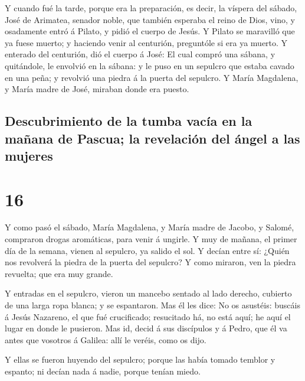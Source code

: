  Y cuando fué la tarde, porque era la preparación, es
decir, la víspera del sábado,  José de Arimatea, senador
noble, que también esperaba el reino de Dios, vino, y osadamente entró á
Pilato, y pidió el cuerpo de Jesús.  Y Pilato se
maravilló que ya fuese muerto; y haciendo venir al centurión, preguntóle
si era ya muerto.  Y enterado del centurión, dió el
cuerpo á José:  El cual compró una sábana, y quitándole,
le envolvió en la sábana: y le puso en un sepulcro que estaba cavado en
una peña; y revolvió una piedra á la puerta del sepulcro.
 Y María Magdalena, y María madre de José, miraban donde
era puesto.

\hypertarget{descubrimiento-de-la-tumba-vacuxeda-en-la-mauxf1ana-de-pascua-la-revelaciuxf3n-del-uxe1ngel-a-las-mujeres}{%
\subsection{Descubrimiento de la tumba vacía en la mañana de Pascua; la
revelación del ángel a las
mujeres}\label{descubrimiento-de-la-tumba-vacuxeda-en-la-mauxf1ana-de-pascua-la-revelaciuxf3n-del-uxe1ngel-a-las-mujeres}}

\hypertarget{section-41-16}{%
\section{16}\label{section-41-16}}

 Y como pasó el sábado, María Magdalena, y María madre de
Jacobo, y Salomé, compraron drogas aromáticas, para venir á ungirle.
 Y muy de mañana, el primer día de la semana, vienen al
sepulcro, ya salido el sol.  Y decían entre sí: ¿Quién nos
revolverá la piedra de la puerta del sepulcro?  Y como
miraron, ven la piedra revuelta; que era muy grande.

 Y entradas en el sepulcro, vieron un mancebo sentado al
lado derecho, cubierto de una larga ropa blanca; y se espantaron.
 Mas él les dice: No os asustéis: buscáis á Jesús
Nazareno, el que fué crucificado; resucitado há, no está aquí; he aquí
el lugar en donde le pusieron.  Mas id, decid á sus
discípulos y á Pedro, que él va antes que vosotros á Galilea: allí le
veréis, como os dijo.

 Y ellas se fueron huyendo del sepulcro; porque las había
tomado temblor y espanto; ni decían nada á nadie, porque tenían miedo.

